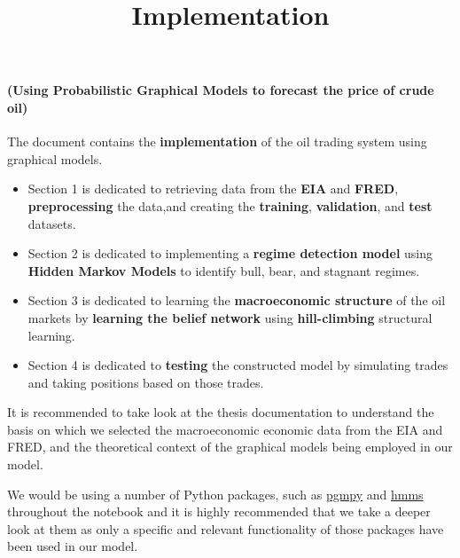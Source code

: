 \documentclass[11pt]{article}
\title{Implementation}
\providecommand{\tightlist}{%
      \setlength{\itemsep}{0pt}\setlength{\parskip}{0pt}}
\begin{document}
    
    
    \maketitle
    
    

    
    \hypertarget{implementation}{%
\section{\Implementation}\label{implementation}}

\hypertarget{using-probabilistic-graphical-models-to-forecast-the-price-of-crude-oil}{%
\paragraph{(Using Probabilistic Graphical Models to forecast the price
of crude
oil)}\label{using-probabilistic-graphical-models-to-forecast-the-price-of-crude-oil}}

The document contains the \textbf{implementation} of the oil trading
system using graphical models.

\begin{itemize}
\tightlist
\item
  Section 1 is dedicated to retrieving data from the
  \textbf{EIA} and \textbf{FRED}, \textbf{preprocessing} the data,and
  creating the \textbf{training}, \textbf{validation}, and \textbf{test}
  datasets.
\item
  Section 2 is dedicated to implementing a \textbf{regime
  detection model} using \textbf{Hidden Markov Models} to identify bull,
  bear, and stagnant regimes.
\item
  Section 3 is dedicated to learning the \textbf{macroeconomic
  structure} of the oil markets by \textbf{learning the belief network}
  using \textbf{hill-climbing} structural learning.
\item
  Section 4 is dedicated to \textbf{testing} the constructed
  model by simulating trades and taking positions based on those trades.
\end{itemize}

It is recommended to take look at the thesis documentation to understand
the basis on which we selected the macroeconomic economic data from the
EIA and FRED, and the theoretical context of the graphical models being
employed in our model.

We would be using a number of Python packages, such as
\href{http://pgmpy.org/}{pgmpy} and
\href{https://github.com/lopatovsky/HMMs}{hmms} throughout the notebook
and it is highly recommended that we take a deeper look at them as only
a specific and relevant functionality of those packages have been used
in our model.
\end{document}
